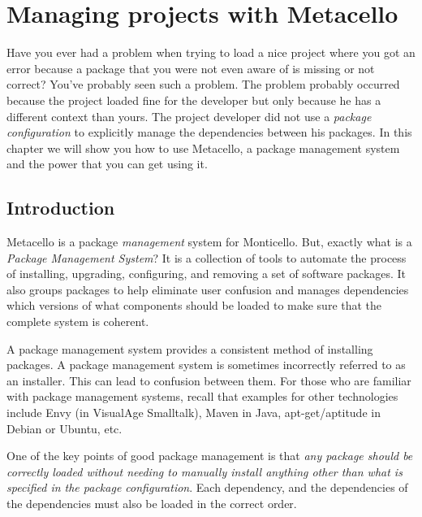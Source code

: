 \documentclass[a4paper,10pt,twoside]{book}
\begin{document}
\fi
\sloppy



\chapter{Managing projects with Metacello}
\chapterauthor{\authordale{} \\ \authormariano{}}

Have you ever had a problem when trying to load a nice project where you got an error because a package that you were not even aware of  is missing or not correct? You've probably seen such a problem. The problem probably occurred because the project loaded fine for the  developer but only because he has a different context than yours. The project developer did not use a \emph{package configuration} to explicitly manage the dependencies between his packages. In this chapter we will show you how to use Metacello, a package management system and the power that you can get using it. 

\section{Introduction}

Metacello is a package \textit{management} system for Monticello. But, exactly what is a \textit{Package Management System}?
It is a collection of tools to automate the process of installing, upgrading, configuring, and removing a set of software packages. It also groups packages to help eliminate user confusion and manages dependencies \ie which versions of what components should be loaded to make sure that the complete system is coherent. 

A package management system provides a consistent method of installing packages. A package management system is sometimes incorrectly referred to as an installer. This can lead to confusion between them. For those who are familiar with package management systems, recall that examples for other technologies include Envy (in VisualAge Smalltalk), Maven in Java, apt-get/aptitude in Debian or Ubuntu, etc.

One of the key points of good package management is that \emph{any package should be correctly loaded without needing to manually install anything other than what is specified in the package configuration}. Each dependency, and the dependencies of the dependencies must also be loaded in the correct order. 
\end{document}
